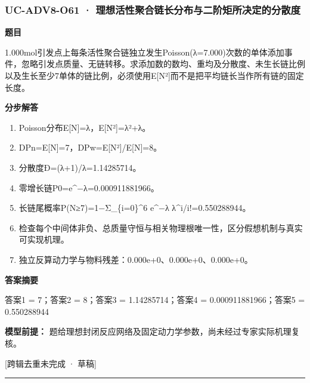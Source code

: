 \documentclass[UTF8,11pt,a4paper]{ctexart}
\begin{document}
\subsubsection*{UC-ADV8-O61 · 理想活性聚合链长分布与二阶矩所决定的分散度}
\noindent\textbf{题目}\par
1.000mol引发点上每条活性聚合链独立发生Poisson(λ=7.000)次数的单体添加事件，忽略引发点质量、无链转移。求添加数的数均、重均及分散度、未生长链比例以及生长至少7单体的链比例，必须使用E[N²]而不是把平均链长当作所有链的固定长度。\par
\medskip\noindent\textbf{分步解答}
\begin{enumerate}
\item Poisson分布E[N]=λ，E[N²]=λ²+λ。
\item DPn=E[N]=7，DPw=E[N²]/E[N]=8。
\item 分散度Đ=(λ+1)/λ=1.14285714。
\item 零增长链P0=e\textasciicircum{}−λ=0.000911881966。
\item 长链尾概率P(N≥7)=1−Σ\_\{i=0\}\textasciicircum{}6 e\textasciicircum{}−λ λ\textasciicircum{}i/i!=0.550288944。
\item 检查每个中间体非负、总质量守恒与相关物理根唯一性，区分假想机制与真实可实现机理。
\item 独立反算动力学与物料残差：0.000e+0、0.000e+0、0.000e+0。
\end{enumerate}
\noindent\textbf{答案摘要}\par
答案1 = 7；答案2 = 8；答案3 = 1.14285714；答案4 = 0.000911881966；答案5 = 0.550288944\par
\noindent\textbf{模型前提：}
题给理想封闭反应网络及固定动力学参数，尚未经过专家实际机理复核。\par
\noindent\textcolor{red!65!black}{[跨辑去重未完成 · 草稿]} \par
\medskip\hrule\medskip
{}
\end{document}
